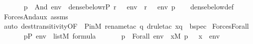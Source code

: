 \begin{isabellebody}
\ \ \isanewline
\ \ \ \ {\isachardoublequoteopen}{\isacharparenleft}{\kern0pt}p\ {\isasymtturnstile}\ And{\isacharparenleft}{\kern0pt}{\isasymphi}{\isacharcomma}{\kern0pt}{\isasympsi}{\isacharparenright}{\kern0pt}\ env{\isacharparenright}{\kern0pt}\ {\isasymlongleftrightarrow}\ dense{\isacharunderscore}{\kern0pt}below{\isacharparenleft}{\kern0pt}{\isacharbraceleft}{\kern0pt}r{\isasymin}P{\isachardot}{\kern0pt}\ {\isacharparenleft}{\kern0pt}r\ {\isasymtturnstile}\ {\isasymphi}\ env{\isacharparenright}{\kern0pt}\ {\isasymand}\ {\isacharparenleft}{\kern0pt}r\ {\isasymtturnstile}\ {\isasympsi}\ env{\isacharparenright}{\kern0pt}\ {\isacharbraceright}{\kern0pt}{\isacharcomma}{\kern0pt}p{\isacharparenright}{\kern0pt}{\isachardoublequoteclose}\isanewline
%
\isadelimproof
\ \ %
\endisadelimproof
%
\isatagproof
{}\isamarkupfalse%
\ dense{\isacharunderscore}{\kern0pt}below{\isacharunderscore}{\kern0pt}def\ \isamarkupfalse%
\ Forces{\isacharunderscore}{\kern0pt}And{\isacharunderscore}{\kern0pt}aux\ assms\isanewline
\ \ \ \ \isamarkupfalse%
\ {\isacharparenleft}{\kern0pt}auto\ dest{\isacharcolon}{\kern0pt}transitivity{\isacharbrackleft}{\kern0pt}OF\ {\isacharunderscore}{\kern0pt}\ P{\isacharunderscore}{\kern0pt}in{\isacharunderscore}{\kern0pt}M{\isacharbrackright}{\kern0pt}{\isacharsemicolon}{\kern0pt}\ rename{\isacharunderscore}{\kern0pt}tac\ q{\isacharsemicolon}{\kern0pt}\ drule{\isacharunderscore}{\kern0pt}tac\ x{\isacharequal}{\kern0pt}q\ \ bspec{\isacharparenright}{\kern0pt}{\isacharplus}{\kern0pt}%
\endisatagproof
{\isafoldproof}%
%
\isadelimproof
\isanewline
%
\endisadelimproof
\isanewline
{}\isamarkupfalse%
\ Forces{\isacharunderscore}{\kern0pt}Forall{\isacharcolon}{\kern0pt}\isanewline
\ \ \isanewline
\ \ \ \ {\isachardoublequoteopen}p{\isasymin}P{\isachardoublequoteclose}\ {\isachardoublequoteopen}env\ {\isasymin}\ list{\isacharparenleft}{\kern0pt}M{\isacharparenright}{\kern0pt}{\isachardoublequoteclose}\ {\isachardoublequoteopen}{\isasymphi}{\isasymin}formula{\isachardoublequoteclose}\isanewline
\ \ \isanewline
\ \ \ \ {\isachardoublequoteopen}{\isacharparenleft}{\kern0pt}p\ {\isasymtturnstile}\ Forall{\isacharparenleft}{\kern0pt}{\isasymphi}{\isacharparenright}{\kern0pt}\ env{\isacharparenright}{\kern0pt}\ {\isasymlongleftrightarrow}\ {\isacharparenleft}{\kern0pt}{\isasymforall}x{\isasymin}M{\isachardot}{\kern0pt}\ {\isacharparenleft}{\kern0pt}p\ {\isasymtturnstile}\ {\isasymphi}\ {\isacharparenleft}{\kern0pt}{\isacharbrackleft}{\kern0pt}x{\isacharbrackright}{\kern0pt}\ {\isacharat}{\kern0pt}\ env{\isacharparenright}{\kern0pt}{\isacharparenright}{\kern0pt}{\isacharparenright}{\kern0pt}{\isachardoublequoteclose}\isanewline

\end{isabellebody}
